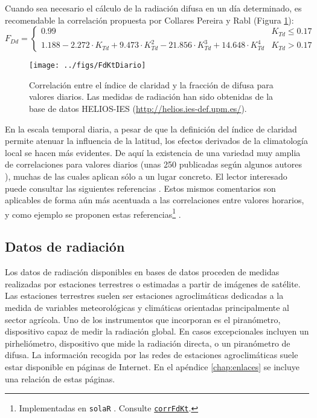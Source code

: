 Cuando sea necesario el cálculo de la radiación difusa en un día determinado,
es recomendable la correlación propuesta por Collares Pereira y Rabl
\cite{Collares-Pereira.Rabl1979}(Figura \ref{fig:KtFDd}):\begin{equation}
F_{Dd}=\begin{cases}
0.99 & K_{Td}\leq0.17\\
1.188-2.272\cdot K_{Td}+9.473\cdot K_{Td}^{2}-21.856\cdot K_{Td}^{3}+14.648\cdot K_{Td}^{4} & K_{Td}>0.17\end{cases}\label{eq:FDdCollares}\end{equation}

%
\begin{figure}
\texttt{[image: ../figs/FdKtDiario]}

\caption{Correlación entre el índice de claridad y la fracción de difusa para
valores diarios. Las medidas de radiación han sido obtenidas de la
base de datos HELIOS-IES (\protect\url{http://helios.ies-def.upm.es/}).\label{fig:KtFDd}}

\end{figure}


En la escala temporal diaria, a pesar de que la definición del índice
de claridad permite atenuar la influencia de la latitud, los efectos
derivados de la climatología local se hacen más evidentes. De aquí
la existencia de una variedad muy amplia de correlaciones para valores
diarios (unas 250 publicadas según algunos autores \cite{Miguel.Bilbao.ea2001}),
muchas de las cuales aplican sólo a un lugar concreto. El lector interesado
puede consultar las siguientes referencias \cite{Miguel.Bilbao.ea2001,Soler1990,Gopinathan.Soler1995,Macagnan1993}.
Estos mismos comentarios son aplicables de forma aún más acentuada
a las correlaciones entre valores horarios, y como ejemplo se proponen
estas referencias\footnote{Implementadas en \texttt{solaR} \cite{Perpinan2012b}. Consulte \href{http://search.r-project.org/R/library/solaR/html/corrFdKt.html}{\texttt{corrFdKt}}.} \cite{Collares-Pereira.Rabl1979, Erbs.Klein.ea1982, Ridley.Boland.ea2010}.


\subsection{Datos de radiación}

Los datos de radiación disponibles en bases de datos proceden de medidas
realizadas por estaciones terrestres o estimadas a partir de imágenes
de satélite. Las estaciones terrestres suelen ser estaciones agroclimáticas
dedicadas a la medida de variables meteorológicas y climáticas orientadas
principalmente al sector agrícola. Uno de los instrumentos que incorporan
es el piranómetro, dispositivo capaz de medir la radiación global.
En casos excepcionales incluyen un pirheliómetro, dispositivo que
mide la radiación directa, o un piranómetro de difusa. La información
recogida por las redes de estaciones agroclimáticas suele estar disponible
en páginas de Internet. En el apéndice \ref{chap:enlaces} se incluye una
relación de estas páginas.

